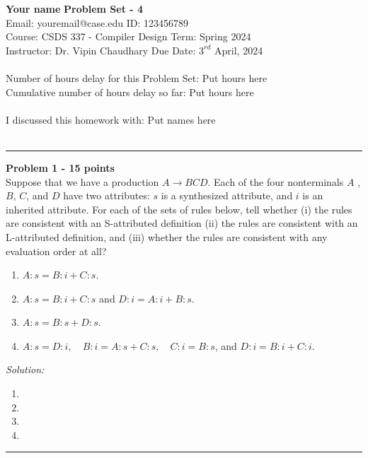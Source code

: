 \documentclass[a4paper, 11pt]{article}
\newenvironment{problem}[2][Problem]
    { \begin{mdframed}[backgroundcolor=gray!20] \textbf{#1 #2} \\}
    {  \end{mdframed}}
\newenvironment{solution}
    {\textit{Solution:}}
    {}
\begin{document}
\noindent
\large\textbf{Your name} \hfill \textbf{Problem Set - 4}   \\
Email: youremail@case.edu \hfill ID: 123456789 \\
\normalsize Course: CSDS 337 - Compiler Design \hfill Term: Spring 2024\\
Instructor: Dr. Vipin Chaudhary \hfill Due Date: $3^{rd}$ April, 2024 \\ \\
Number of hours delay for this Problem Set: \hfill Put hours here\\
Cumulative number of hours delay so far: \hfill Put hours here \\ \\
I discussed this homework with: \hfill Put names here \\ \\

\noindent\rule{7in}{2.8pt}
\begin{problem}{1 - 15 points}
Suppose that we have a production $A \rightarrow BCD$. Each of  the four nonterminals $A$ , $B$, $C$, and $D$ have two attributes: $s$ is a synthesized  attribute, and $i$ is an inherited attribute. For each of the sets of rules below,  tell whether (i) the rules are consistent with an S-attributed definition (ii) the  rules are consistent with an L-attributed definition, and (iii) whether the rules  are consistent with any evaluation order at all?  

\begin{enumerate}[a]
    \item $A:s = B :i + C:s.$  
    \item $A:s = B :i + C:s$ and $D:i = A:i + B :s.$  
    \item $A:s = B :s + D:s.$
    \item $A:s = D:i, \quad B :i = A:s + C:s, \quad C:i = B :s$, and $D:i = B :i + C:i.$ 
\end{enumerate}
    
\end{problem}
\begin{solution}

\begin{enumerate}[a]
    \item 
    \item 
    \item 
    \item 
\end{enumerate}
\end{solution} 
\noindent\rule{7in}{2.8pt}
\end{document}
